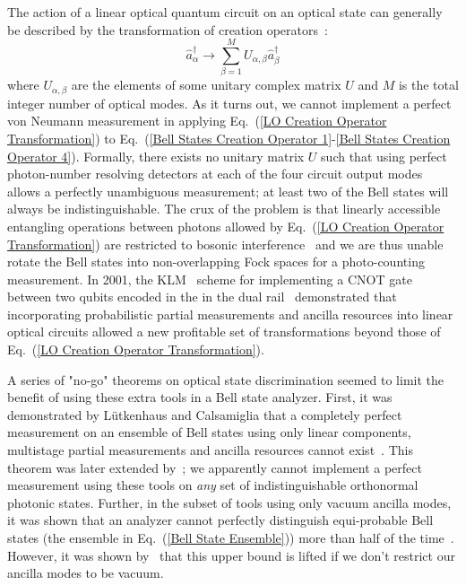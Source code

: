 \documentclass[aps,pra,twocolumn,showpacs,superscriptaddress,floatfix,10pt]{revtex4}
\begin{document}
The action of a linear optical quantum circuit on an optical state can generally be described by the transformation of creation operators~\cite{Review Paper,Reck}:
\begin{equation}
\label{LO Creation Operator Transformation}
\hat{a}^\dagger_\alpha \rightarrow \sum_{\beta=1}^{M} U_{\alpha,\beta} \hat{a}^\dagger_\beta
\end{equation}
where $U_{\alpha,\beta}$ are the elements of some unitary complex matrix $U$ and $M$ is the total integer number of optical modes. As it turns out, we cannot implement a perfect von Neumann measurement in applying Eq.~(\ref{LO Creation Operator Transformation}) to Eq.~(\ref{Bell States Creation Operator 1}-\ref{Bell States Creation Operator 4}). Formally, there exists no unitary matrix $U$ such that using perfect photon-number resolving detectors at each of the four circuit output modes allows a perfectly unambiguous measurement; at least two of the Bell states will always be indistinguishable. The crux of the problem is that linearly accessible entangling operations between photons allowed by Eq.~(\ref{LO Creation Operator Transformation}) are restricted to bosonic interference~\cite{Review Paper} and we are thus unable rotate the Bell states into non-overlapping Fock spaces for a photo-counting measurement. In 2001, the KLM~\cite{KLM,KLM2} scheme for implementing a CNOT gate between two qubits encoded in the in the dual rail~\cite{Review Paper} demonstrated that incorporating probabilistic partial measurements and ancilla resources into linear optical circuits allowed a new profitable set of transformations beyond those of Eq.~(\ref{LO Creation Operator Transformation}). 

A series of "no-go" theorems on optical state discrimination seemed to limit the benefit of using these extra tools in a Bell state analyzer. First, it was demonstrated by L\"utkenhaus and Calsamiglia that a completely perfect measurement on an ensemble of Bell states using only linear components, multistage partial measurements and ancilla resources cannot exist~\cite{Lutkenhaus}. This theorem was later extended by~\cite{Carollo}; we apparently cannot implement a perfect measurement using these tools on \textit{any} set of indistinguishable orthonormal photonic states. Further, in the subset of tools using only vacuum ancilla modes, it was shown that an analyzer cannot perfectly distinguish equi-probable Bell states (the ensemble in Eq.~(\ref{Bell State Ensemble})) more than half of the time~\cite{Calsamiglia}. However, it was shown by~\cite{Ewert} that this upper bound is lifted if we don't restrict our ancilla modes to be vacuum.
\end{document}
